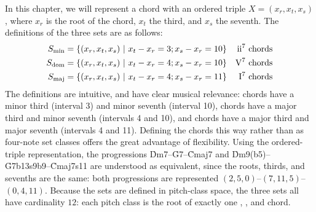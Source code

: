 In this chapter, we will represent a chord with an ordered triple $X = (x_r,
x_t, x_s)$, where $x_r$ is the root of the chord, $x_t$ the third, and $x_s$
the seventh. The definitions of the three sets are as follows:
{\novspace%
\begin{align*}
  \Smin &= \{ (x_r, x_t, x_s)\ |\ x_t - x_r = 3; x_s - x_r = 10 \} &
    \text{\ii chords} \\ %
  \Sdom &= \{ (x_r, x_t, x_s)\ |\ x_t - x_r = 4; x_s - x_r = 10 \} &
    \text{\V chords} \\ %
  \Smaj &= \{ (x_r, x_t, x_s)\ |\ x_t - x_r = 4; x_s - x_r = 11 \} &
    \text{\I chords}
\end{align*}}
%
The definitions are intuitive, and have clear musical relevance: \ii
chords have a minor third (interval 3) and minor seventh (interval 10),
\V chords have a major third and minor seventh (intervals 4 and 10),
and \I chords have a major third and major seventh (intervals 4 and
11). Defining the chords this way rather than as four-note set classes offers
the great advantage of flexibility. Using the ordered-triple representation,
the progressions \h{Dm7}--\h{G7}--\h{Cmaj7} and
\h{Dm9(b5)}--\h{G7b13s9b9}--\h{Cmaj7s11} are understood as equivalent, since
the roots, thirds, and sevenths are the same: both progressions are
represented $(2, 5, 0)$--\allowbreak$(7, 11, 5)$--\allowbreak$(0, 4, 11)$.
Because the sets are defined in pitch-class space, the three sets all have
cardinality $12$: each pitch class is the root of exactly one \ii,
\V, and \I chord.

